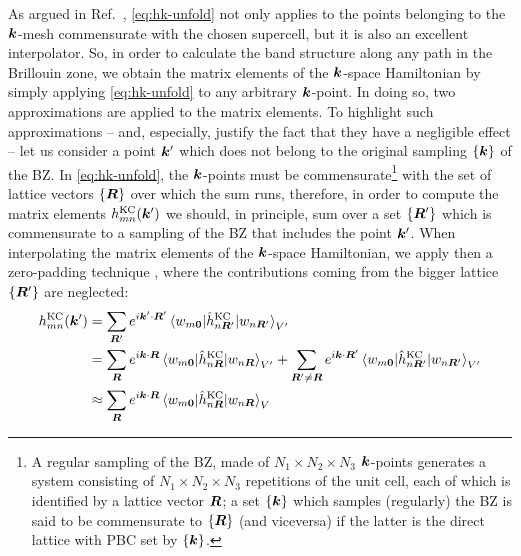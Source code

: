As argued in Ref.~\cite{lee_band_2005}, \cref{eq:hk-unfold} not only applies to the points belonging to the ${\bm k}$-mesh commensurate with the chosen supercell, but it is also an excellent interpolator. So, in order to calculate the band structure along any path in the Brillouin zone, we obtain the matrix elements of the ${\bm k}$-space Hamiltonian by simply applying \cref{eq:hk-unfold} to any arbitrary ${\bm k}$-point. In doing so, two approximations are applied to the matrix elements. To highlight such approximations -- and, especially, justify the fact that they have a negligible effect -- let us consider a point ${\bm k}'$ which does not belong to the original sampling $\{ {\bm k} \}$ of the BZ. In \cref{eq:hk-unfold}, the ${\bm k}$-points must be commensurate\footnote{
A regular sampling of the BZ, made of $N_1 \times N_2 \times N_3$ ${\bm k}$-points generates a system consisting of $N_1 \times N_2 \times N_3$ repetitions of the unit cell, each of which is identified by a lattice vector ${\bm R}$; a set $\{ {\bm k} \}$ which samples (regularly) the BZ is said to be commensurate to $\{ {\bm R} \}$ (and viceversa) if the latter is the direct lattice with PBC set by $\{ {\bm k} \}$.
}
with the set of lattice vectors $\{ {\bm R} \}$ over which the sum runs, therefore, in order to compute the matrix elements $h^{\rm KC}_{mn}({\bm k}')$ we should, in principle, sum over a set $\{ {\bm R}' \}$ which is commensurate to a sampling of the BZ that includes the point ${\bm k}'$. When interpolating the matrix elements of the ${\bm k}$-space Hamiltonian, we apply then a zero-padding technique \cite{buongiorno_nardelli_paoflow_2018}, where the contributions coming from the bigger lattice $\{ {\bm R}' \}$ are neglected:
%
\begin{equation}
    \begin{split}
        h^{\rm KC}_{mn}({\bm k}') &= \sum_{{\bm R}'} e^{i {\bm k}' \cdot {\bm R}'} \braket{w_{m\bm{0}} | \hat{h}^{\rm KC}_{n{\bm R}'} | w_{n{\bm R}'}}_{V'} \\
        &= \sum_{{\bm R}} e^{i {\bm k} \cdot {\bm R}} \braket{w_{m\bm{0}} | \hat{h}^{\rm KC}_{n{\bm R}} | w_{n{\bm R}}}_{V'} + \sum_{{\bm R}' \neq {\bm R}} e^{i {\bm k} \cdot {\bm R}'} \braket{w_{m\bm{0}} | \hat{h}^{\rm KC}_{n{\bm R}'} | w_{n{\bm R}'}}_{V'} \\
        &\approx \sum_{{\bm R}} e^{i {\bm k} \cdot {\bm R}} \braket{w_{m\bm{0}} | \hat{h}^{\rm KC}_{n{\bm R}} | w_{n{\bm R}}}_{V}
    \end{split}
    \label{eq:hk-interpolated}
\end{equation}
%
